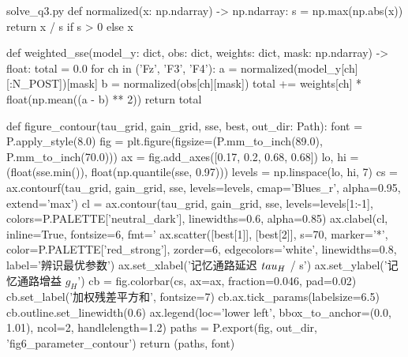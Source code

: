 \documentclass[bwprint]{gmcmthesis}
\begin{document}
\begin{appendices}
\begin{Python}{solve\_q3.py}
def normalized(x: np.ndarray) -> np.ndarray:
    s = np.max(np.abs(x))
    return x / s if s > 0 else x

def weighted_sse(model_y: dict, obs: dict, weights: dict, mask: np.ndarray) -> float:
    total = 0.0
    for ch in ('Fz', 'F3', 'F4'):
        a = normalized(model_y[ch][:N_POST])[mask]
        b = normalized(obs[ch][mask])
        total += weights[ch] * float(np.mean((a - b) ** 2))
    return total

def figure_contour(tau_grid, gain_grid, sse, best, out_dir: Path):
    font = P.apply_style(8.0)
    fig = plt.figure(figsize=(P.mm_to_inch(89.0), P.mm_to_inch(70.0)))
    ax = fig.add_axes([0.17, 0.2, 0.68, 0.68])
    lo, hi = (float(sse.min()), float(np.quantile(sse, 0.97)))
    levels = np.linspace(lo, hi, 7)
    cs = ax.contourf(tau_grid, gain_grid, sse, levels=levels, cmap='Blues_r', alpha=0.95, extend='max')
    cl = ax.contour(tau_grid, gain_grid, sse, levels=levels[1:-1], colors=P.PALETTE['neutral_dark'], linewidths=0.6, alpha=0.85)
    ax.clabel(cl, inline=True, fontsize=6, fmt='%
    ax.scatter([best[1]], [best[2]], s=70, marker='*', color=P.PALETTE['red_strong'], zorder=6, edgecolors='white', linewidths=0.8, label='辨识最优参数')
    ax.set_xlabel('记忆通路延迟 $\\tau_H$ / s')
    ax.set_ylabel('记忆通路增益 $g_H$')
    cb = fig.colorbar(cs, ax=ax, fraction=0.046, pad=0.02)
    cb.set_label('加权残差平方和', fontsize=7)
    cb.ax.tick_params(labelsize=6.5)
    cb.outline.set_linewidth(0.6)
    ax.legend(loc='lower left', bbox_to_anchor=(0.0, 1.01), ncol=2, handlelength=1.2)
    paths = P.export(fig, out_dir, 'fig6_parameter_contour')
    return (paths, font)


\end{Python}
\end{appendices}
\end{document}
